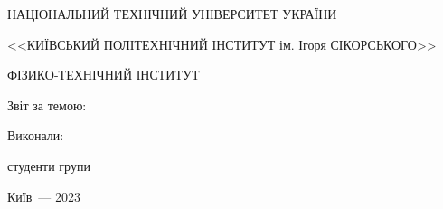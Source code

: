 \thispagestyle{empty}

\begin{center}
НАЦІОНАЛЬНИЙ ТЕХНІЧНИЙ УНІВЕРСИТЕТ УКРАЇНИ \par
<<КИЇВСЬКИЙ ПОЛІТЕХНІЧНИЙ ІНСТИТУТ ім. Ігоря СІКОРСЬКОГО>>\par
ФІЗИКО-ТЕХНІЧНИЙ ІНСТИТУТ\par

\vspace{40mm}
{\huge Звіт за темою: \par}

\Large\MakeUppercase{\textbf{\reportTitle}} \par
\end{center}

\vspace{40mm}
\begin{flushright}
Виконали: 

студенти групи \reportAuthorGroup

\reportAuthor

\vspace{20mm}



\end{flushright}

\vspace{10mm}
\begin{center}
{Київ~--- 2023}
\end{center}

\newpage

